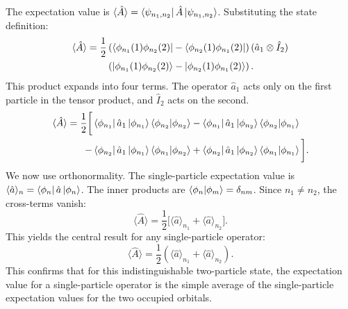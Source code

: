 The expectation value is $\langle \hat{A} \rangle =
\bra{\psi_{n_1, n_2}} \hat{A} \ket{\psi_{n_1, n_2}}$.
Substituting the state definition:
\begin{align}
  \langle \hat{A} \rangle = \frac{1}{2}
    & \left( \bra{{\phi}_{n_1}(1){\phi}_{n_2}(2)} -
      \bra{{\phi}_{n_2}(1){\phi}_{n_1}(2)} \right)
      (\hat{a}_1 \otimes \hat{I}_2) \nonumber \\
    & \left( \ket{{\phi}_{n_1}(1){\phi}_{n_2}(2)} -
      \ket{{\phi}_{n_2}(1){\phi}_{n_1}(2)} \right).
\end{align}
This product expands into four terms. The operator $\hat{a}_1$ acts
only on the first particle in the tensor product, and $\hat{I}_2$ acts
on the second.
\begin{align}
  \langle \hat{A} \rangle = \frac{1}{2}
    \bigg[
      & \bra{{\phi}_{n_1}}\hat{a}_1\ket{{\phi}_{n_1}}
        \braket{{\phi}_{n_2} | {\phi}_{n_2}}
      - \bra{{\phi}_{n_1}}\hat{a}_1\ket{{\phi}_{n_2}}
        \braket{{\phi}_{n_2} | {\phi}_{n_1}} \nonumber \\
    - & \bra{{\phi}_{n_2}}\hat{a}_1\ket{{\phi}_{n_1}}
        \braket{{\phi}_{n_1} | {\phi}_{n_2}}
      + \bra{{\phi}_{n_2}}\hat{a}_1\ket{{\phi}_{n_2}}
        \braket{{\phi}_{n_1} | {\phi}_{n_1}}
    \bigg].
\end{align}
We now use orthonormality. The single-particle expectation value
is $\langle \hat{a} \rangle_n = \bra{{\phi}_n}\hat{a}\ket{{\phi}_n}$.
The inner products are $\braket{{\phi}_n | {\phi}_m} =
\delta_{nm}$. Since $n_1 \neq n_2$, the cross-terms vanish:
\begin{equation}
  \langle \hat{A} \rangle = \frac{1}{2}
    \bigg[ \langle \hat{a} \rangle_{n_1} + \langle \hat{a} \rangle_{n_2} \bigg].
\end{equation}
This yields the central result for any single-particle operator:
\begin{equation} \label{eq:general_property}
  \langle \hat{A} \rangle = \frac{1}{2} \left(
  \langle \hat{a} \rangle_{n_1} + \langle \hat{a} \rangle_{n_2} \right).
\end{equation}
This confirms that for this indistinguishable two-particle state,
the expectation value for a single-particle operator is the
simple average of the single-particle expectation values
for the two occupied orbitals.

